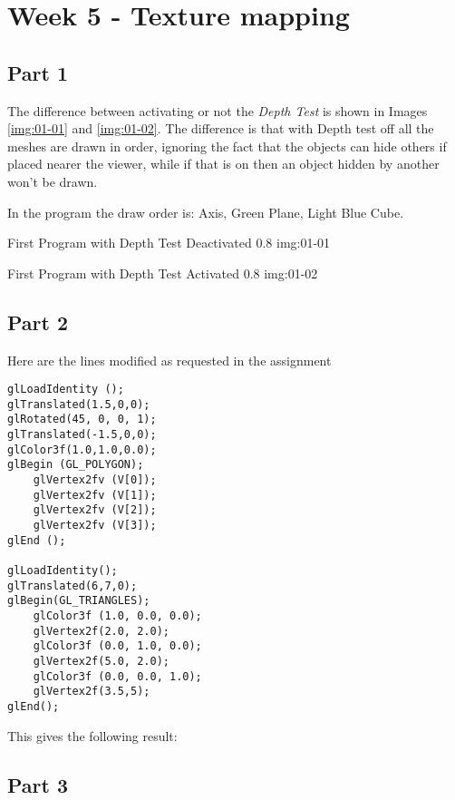 \chapter{Week 5 - Texture mapping}

\section{Part 1}
  The difference between activating or not the \emph{Depth Test} is shown in Images \ref{img:01-01}
  and \ref{img:01-02}. The difference is that with Depth test off all the meshes are drawn in order,
  ignoring the fact that the objects can hide others if placed nearer the viewer, while if that is on 
  then an object hidden by another won't be drawn.

  In the program the draw order is: Axis, Green Plane, Light Blue Cube.

        {First Program with Depth Test Deactivated}
        {0.8}
        {img:01-01}

        {First Program with Depth Test Activated}
        {0.8}
        {img:01-02}


\section{Part 2}

Here are the lines modified as requested in the assignment
\begin{lstlisting}[caption=Snapshot from Part2.cpp]
glLoadIdentity ();
glTranslated(1.5,0,0);
glRotated(45, 0, 0, 1);
glTranslated(-1.5,0,0);
glColor3f(1.0,1.0,0.0);
glBegin (GL_POLYGON);
    glVertex2fv (V[0]);
    glVertex2fv (V[1]);
    glVertex2fv (V[2]);
    glVertex2fv (V[3]);
glEnd ();

glLoadIdentity();
glTranslated(6,7,0);
glBegin(GL_TRIANGLES);
    glColor3f (1.0, 0.0, 0.0);
    glVertex2f(2.0, 2.0);
    glColor3f (0.0, 1.0, 0.0);
    glVertex2f(5.0, 2.0);
    glColor3f (0.0, 0.0, 1.0);
    glVertex2f(3.5,5);
glEnd();
\end{lstlisting}

This gives the following result:



\section{Part 3}

